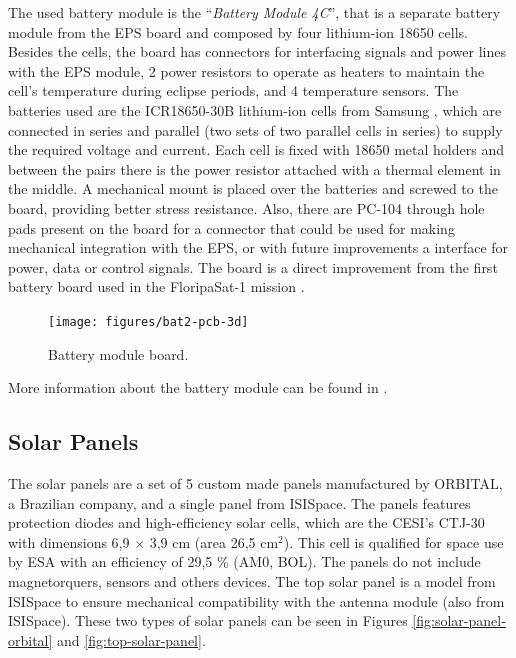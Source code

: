 The used battery module is the ``\textit{Battery Module 4C}'', that is a separate battery module from the EPS board and composed by four lithium-ion 18650 cells. Besides the cells, the board has connectors for interfacing signals and power lines with the EPS module, 2 power resistors to operate as heaters to maintain the cell's temperature during eclipse periods, and 4 temperature sensors. The batteries used are the ICR18650-30B lithium-ion cells from Samsung \cite{icr18650-30b}, which are connected in series and parallel (two sets of two parallel cells in series) to supply the required voltage and current. Each cell is fixed with 18650 metal holders and between the pairs there is the power resistor attached with a thermal element in the middle. A mechanical mount is placed over the batteries and screwed to the board, providing better stress resistance. Also, there are PC-104 through hole pads present on the board for a connector that could be used for making mechanical integration with the EPS, or with future improvements a interface for power, data or control signals. The board is a direct improvement from the first battery board used in the FloripaSat-1 mission \cite{floripasat}.

\begin{figure}[!ht]
    \begin{center}
        \texttt{[image: figures/bat2-pcb-3d]}
        \caption{Battery module board.}
        \label{fig:battery-module-board}
    \end{center}
\end{figure}

More information about the battery module can be found in \cite{bat4c}.

\subsection{Solar Panels}

The solar panels are a set of 5 custom made panels manufactured by ORBITAL, a Brazilian company, and a single panel from ISISpace. The panels features protection diodes and high-efficiency solar cells, which are the CESI's CTJ-30 \cite{ctj30} with dimensions 6,9 $\times$ 3,9 cm (area 26,5 cm$^{2}$). This cell is qualified for space use by ESA with an efficiency of 29,5 \% (AM0, BOL). The panels do not include magnetorquers, sensors and others devices. The top solar panel is a model from ISISpace to ensure mechanical compatibility with the antenna module (also from ISISpace). These two types of solar panels can be seen in Figures \ref{fig:solar-panel-orbital} and \ref{fig:top-solar-panel}.

